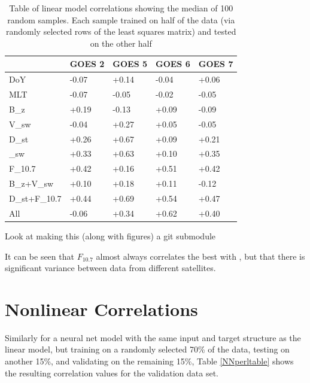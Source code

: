 \begin{table}[h]
	\small
	\begin{tabular}{|L|llll|}
		\hline
		& GOES 2 & GOES 5 & GOES 6 & GOES 7\\ \hline
		DoY & -0.07 & +0.14 & -0.04 & +0.06 \\
		MLT & -0.07 & -0.05 & -0.02 & -0.05 \\
		B_z & +0.19 & -0.13 & +0.09 & -0.09 \\
		V_{sw} & -0.04 & +0.27 & +0.05 & -0.05 \\
		D_{st} & +0.26 & +0.67 & +0.09 & +0.21 \\
		\rho_{sw} & +0.33 & +0.63 & +0.10 & +0.35 \\
		F_{10.7} & +0.42 & +0.16 & +0.51 & +0.42 \\
		B_z+V_{sw} & +0.10 & +0.18 & +0.11 & -0.12 \\
		D_{st}+F_{10.7} & +0.44 & +0.69 & +0.54 & +0.47 \\
		All & -0.06 & +0.34 & +0.62 & +0.40 \\
		\hline
	\end{tabular}
	\caption{Table of linear model correlations showing the median of 100 random samples. Each sample trained on half of the data (via randomly selected rows of the least squares matrix) and tested on the other half} 
	\label{CCperltable}
\end{table}


\vnote Look at making this (along with figures) a git submodule

It can be seen that $F_{10.7}$ almost always correlates the best with \req, but that there is significant variance between data from different satellites. 

\section{Nonlinear Correlations}

Similarly for a neural net model with the same input and target structure as the linear model, but training on a randomly selected 70\% of the data, testing on another 15\%, and validating on the remaining 15\%, Table \ref{NNperltable} shows the resulting correlation values for the validation data set.


